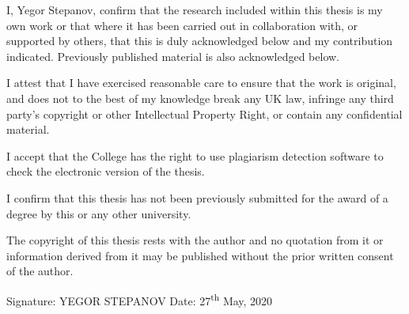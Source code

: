 
\begin{declaration} %

I, Yegor Stepanov, confirm that the research included within this thesis is my own work or that where it has been carried 
out in collaboration with, or supported by others, that this is duly acknowledged below and my contribution indicated. 
Previously published material is also acknowledged below.

I attest that I have exercised reasonable care to ensure that the work is original, 
and does not to the best of my knowledge break any UK law, infringe any third party’s 
copyright or other Intellectual Property Right, or contain any confidential material.

I accept that the College has the right to use plagiarism detection software to check the electronic version of the thesis.

I confirm that this thesis has not been previously submitted for the award of a degree by this or any other university.

The copyright of this thesis rests with the author and no quotation from it or information derived from it may be 
published without the prior written consent of the author.

Signature: YEGOR STEPANOV \quad
Date: 27\textsuperscript{th} May, 2020









\end{declaration}


